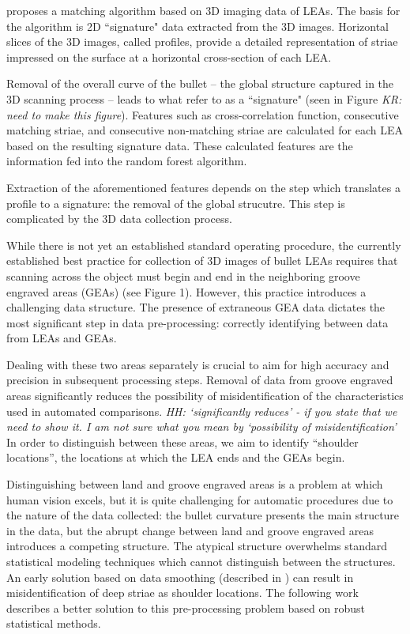 \documentclass[]{article}
\begin{document}
\citet{Hare1} proposes a matching algorithm based on 3D imaging data of
LEAs. The basis for the algorithm is 2D ``signature" data extracted from
the 3D images. Horizontal slices of the 3D images, called profiles,
provide a detailed representation of striae impressed on the surface at
a horizontal cross-section of each LEA.

Removal of the overall curve of the bullet -- the global structure
captured in the 3D scanning process -- leads to what \citet{Hare1} refer
to as a ``signature" (seen in Figure \emph{KR: need to make this
figure}). Features such as cross-correlation function, consecutive
matching striae, and consecutive non-matching striae are calculated for
each LEA based on the resulting signature data. These calculated
features are the information fed into the random forest algorithm.

Extraction of the aforementioned features depends on the step which
translates a profile to a signature: the removal of the global
strucutre. This step is complicated by the 3D data collection process.

While there is not yet an established standard operating procedure, the
currently established best practice for collection of 3D images of
bullet LEAs requires that scanning across the object must begin and end
in the neighboring groove engraved areas (GEAs) (see Figure 1). However,
this practice introduces a challenging data structure. The presence of
extraneous GEA data dictates the most significant step in data
pre-processing: correctly identifying between data from LEAs and GEAs.

Dealing with these two areas separately is crucial to aim for high
accuracy and precision in subsequent processing steps. Removal of data
from groove engraved areas significantly reduces the possibility of
misidentification of the characteristics used in automated comparisons.
\emph{HH: `significantly reduces' - if you state that we need to show
it. I am not sure what you mean by `possibility of misidentification'}
In order to distinguish between these areas, we aim to identify
``shoulder locations'', the locations at which the LEA ends and the GEAs
begin.

Distinguishing between land and groove engraved areas is a problem at
which human vision excels, but it is quite challenging for automatic
procedures due to the nature of the data collected: the bullet curvature
presents the main structure in the data, but the abrupt change between
land and groove engraved areas introduces a competing structure. The
atypical structure overwhelms standard statistical modeling techniques
which cannot distinguish between the structures. An early solution based
on data smoothing (described in \citep{Hare1}) can result in
misidentification of deep striae as shoulder locations. The following
work describes a better solution to this pre-processing problem based on
robust statistical methods.
\end{document}

